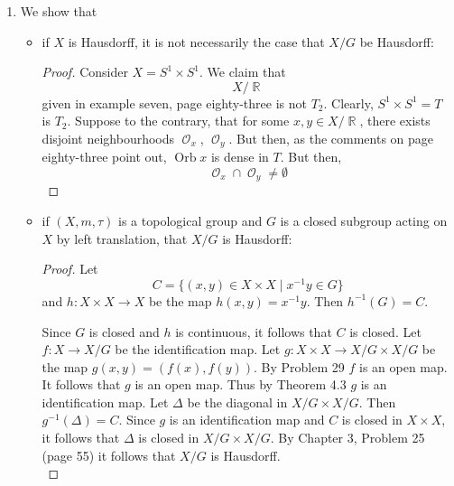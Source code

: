 \documentclass{book}
\DeclareMathOperator*{\R}{\mathbb{R}}
\DeclareMathOperator*{\Ocal}{\mathcal{O}}
\DeclareMathOperator*{\Orb}{\text{Orb}}
\begin{document}
\begin{enumerate}[(1)]
    \item We show that
        \begin{itemize}
            \item if $X$ is Hausdorff, it is not necessarily the case that $X/G$ be Hausdorff:
                \begin{proof} Consider $X = S^1 \times S^1$. We claim that 
                    \[X/\R\]
                    given in example seven, page eighty-three is not $T_2$. Clearly, $S^1 \times S^1 = T$ is $T_2$. Suppose to the contrary, that for some $x,y \in X/\R$, there exists disjoint neighbourhoods $\Ocal_x$, $\Ocal_y$. But then, as the comments on page eighty-three point out, $\Orb x$ is dense in $T$. But then, 
                    \[\Ocal_x \cap \Ocal_y \neq \emptyset\]
                \end{proof}

            \item if $(X, m, \tau)$ is a topological group and $G$ is a closed subgroup acting on $X$ by left translation, that $X/G$ is Hausdorff:
                \begin{proof} Let 
                    \[C=\{(x,y)\in X\times X\mid x^{-1}y\in G\}\]
                    and $h:X\times X\rightarrow X$ be the map $h(x,y)=x^{-1}y$. Then $h^{-1}(G)=C$. 
                    \par Since $G$ is closed and $h$ is continuous, it follows that $C$ is closed.  Let $f:X\rightarrow X/G$ be the identification map.  Let $g:X\times X\rightarrow X/G\times X/G$ be the map $g(x,y)=(f(x),f(y))$.  By Problem 29 $f$ is an open map.  It follows that $g$ is an open map.  Thus by Theorem 4.3 $g$ is an identification map.   Let $\Delta$ be the diagonal in $X/G\times X/G$.  Then $g^{-1}(\Delta)=C$. Since $g$ is an identification map and $C$ is closed in $X\times X$, it follows that $\Delta$ is closed in $X/G\times X/G$.  By Chapter 3, Problem 25 (page 55) it follows that $X/G$ is Hausdorff.\\
                \end{proof}
        \end{itemize}


\end{enumerate}
\end{document}
